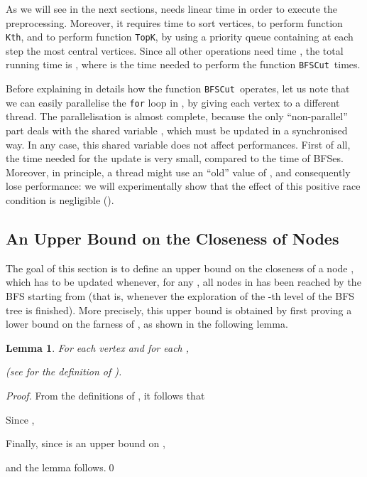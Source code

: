 \documentclass{acm_proc_article-sp}
\newtheorem{lemma}{Lemma}
\newcommand{\bfsc}{BFSCut}
\newcommand{\bfsctt}{\texttt{\upshape \bfsc}}
\begin{document}
As we will see in the next sections,  needs linear time in order to execute the preprocessing. Moreover, it requires time  to sort vertices,  to perform function \texttt{\upshape Kth}, and  to perform function \texttt{\upshape TopK}, by using a priority queue containing at each step the  most central vertices. Since all other operations need time , the total running time is , where  is the time needed to perform the function \bfsctt\  times.

Before explaining in details how the function \bfsctt\ operates, let us note that we can easily parallelise the \texttt{for} loop in , by giving each vertex to a different thread. The parallelisation is almost complete, because the only ``non-parallel'' part deals with the shared variable , which must be updated in a synchronised way. In any case, this shared variable does not affect performances. First of all, the time needed for the update is very small, compared to the time of BFSes. Moreover, in principle, a thread might use an ``old'' value of , and consequently lose performance: we will experimentally show that the effect of this positive race condition is negligible ().

\subsection{An Upper Bound on the Closeness of Nodes}

The goal of this section is to define an upper bound  on the closeness of a node , which has to be updated whenever, for any , all nodes in  has been reached by the BFS starting from  (that is, whenever the exploration of the -th level of the BFS tree is finished). More precisely, this upper bound is obtained by first proving a lower bound on the farness of , as shown in the following lemma.

\begin{lemma} \label{lem:boundokconn}
For each vertex  and for each , 

(see  for the definition of ).
\end{lemma}
\begin{proof}
From the definitions of , it follows that 


Since , 


Finally, since  is an upper bound on ,

and the lemma follows.\qed
\end{proof}
\end{document}
